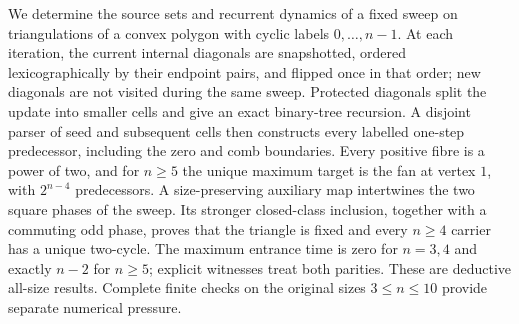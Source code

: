 We determine the source sets and recurrent dynamics of a fixed sweep on
triangulations of a convex polygon with cyclic labels \(0,\ldots,n-1\).
At each iteration, the current internal diagonals are snapshotted, ordered
lexicographically by their endpoint pairs, and flipped once in that order;
new diagonals are not visited during the same sweep. Protected diagonals
split the update into smaller cells and give an exact binary-tree
recursion. A disjoint parser of seed and subsequent cells then constructs
every labelled one-step predecessor, including the zero and comb
boundaries. Every positive fibre is a power of two, and for \(n\ge5\) the
unique maximum target is the fan at vertex \(1\), with \(2^{n-4}\)
predecessors. A size-preserving auxiliary map intertwines the two square
phases of the sweep. Its stronger closed-class inclusion, together with a
commuting odd phase, proves that the triangle is fixed and every
\(n\ge4\) carrier has a unique two-cycle. The maximum entrance time is zero
for \(n=3,4\) and exactly \(n-2\) for \(n\ge5\); explicit witnesses treat
both parities. These are deductive all-size results. Complete finite
checks on the original sizes \(3\le n\le10\) provide separate numerical
pressure.
